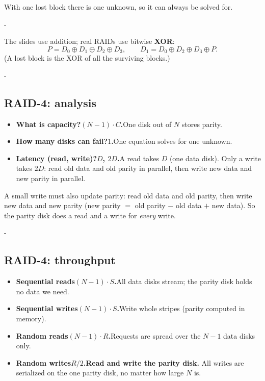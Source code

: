 \documentclass[11pt,a4paper]{article}
\makeatletter
\newcommand{\keepspace}[1]{\par\penalty-100\begingroup
  \setlength{\dimen@}{#1}\dimen@ii\pagegoal\advance\dimen@ii-\pagetotal
  \ifdim\dimen@>\dimen@ii\ifdim\dimen@ii>\z@\vfil\fi\break\fi\endgroup}
\makeatother
\begin{document}
With one lost block there is one unknown, so it can always be solved for.

\keepspace{9\baselineskip}
\begin{quizbox}
The slides use addition; real RAIDs use bitwise \textbf{XOR}:
\[
  P = D_0 \oplus D_1 \oplus D_2 \oplus D_3, \qquad
  D_1 = D_0 \oplus D_2 \oplus D_3 \oplus P .
\]
(A lost block is the XOR of all the surviving blocks.)
\end{quizbox}

\keepspace{9\baselineskip}
\subsection{RAID-4: analysis}

\begin{quizbox}
\begin{itemize}
  \item \textbf{What is capacity?}\quad \textbf{\((N-1) \cdot C\).}\enspace One disk out of \(N\) stores parity.
  \item \textbf{How many disks can fail?}\quad \textbf{\(1\).}\enspace One equation solves for one unknown.
  \item \textbf{Latency (read, write)?}\quad \textbf{\(D\), \(2D\).}\enspace A read takes \(D\) (one data disk). Only a write takes \(2D\): read old data and old parity in parallel, then write new data and new parity in parallel.
\end{itemize}
\end{quizbox}

A small write must also update parity: read old data and old parity, then
write new data and new parity (new parity \(=\) old parity \(-\) old data
\(+\) new data). So the parity disk does a read and a write for
\emph{every} write.

\keepspace{9\baselineskip}
\subsection{RAID-4: throughput}

\begin{quizbox}
\begin{itemize}
  \item \textbf{Sequential reads}\quad \textbf{\((N-1)\cdot S\).}\enspace All data disks stream; the parity disk holds no data we need.
  \item \textbf{Sequential writes}\quad \textbf{\((N-1)\cdot S\).}\enspace Write whole stripes (parity computed in memory).
  \item \textbf{Random reads}\quad \textbf{\((N-1)\cdot R\).}\enspace Requests are spread over the \(N-1\) data disks only.
  \item \textbf{Random writes}\quad \textbf{\(R/2\).}\enspace \textbf{Read and write the parity disk.} All writes are serialized on the one parity disk, no matter how large \(N\) is.
\end{itemize}
\end{quizbox}
\end{document}
